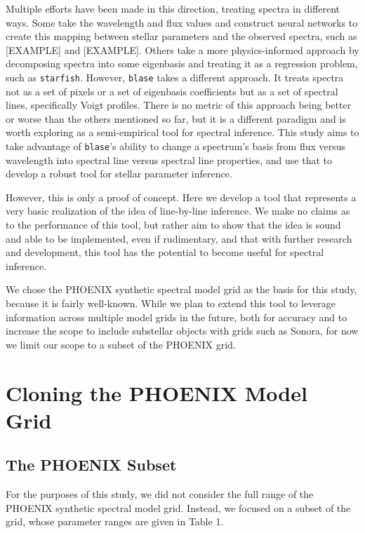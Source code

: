 \documentclass[twocolumn]{aastex631}
\begin{document}
Multiple efforts have been made in this direction, treating spectra in 
different ways. Some take the wavelength and flux values and construct
neural networks to create this mapping between stellar parameters and the
observed spectra, such as [EXAMPLE] and [EXAMPLE]. Others take a more 
physics-informed approach by decomposing spectra into some eigenbasis and 
treating it as a regression problem, such as \texttt{starfish}.
However, \texttt{blase} takes a different approach. It treats spectra not as 
a set of pixels or a set of eigenbasis coefficients but as a set of 
spectral lines, specifically Voigt profiles. There is no metric of this 
approach being better or worse than the others mentioned so far, but it is 
a different paradigm and is worth exploring as a semi-empirical tool for
spectral inference. This study aims to take advantage of \texttt{blase}'s
ability to change a spectrum's basis from flux versus wavelength into
spectral line versus spectral line properties, and use that to develop a
robust tool for stellar parameter inference.

However, this is only a proof of concept. Here we develop a tool that 
represents a very basic realization of the idea of line-by-line inference. 
We make no claims as to the performance of this tool, but rather aim to show 
that the idea is sound and able to be implemented, even if rudimentary, and 
that with further research and development, this tool has the potential to 
become useful for spectral inference.

We chose the PHOENIX synthetic spectral model grid as the basis for this 
study, because it is fairly well-known. While we plan to extend this tool to 
leverage information across multiple model grids in the future, both for 
accuracy and to increase the scope to include substellar objects with grids
such as Sonora, for now we limit our scope to a subset of the PHOENIX grid.

\section{Cloning the PHOENIX Model Grid}
\subsection{The PHOENIX Subset}
For the purposes of this study, we did not consider the full range of the
PHOENIX synthetic spectral model grid. Instead, we focused on a subset of 
the grid, whose parameter ranges are given in Table 1.
\end{document}
